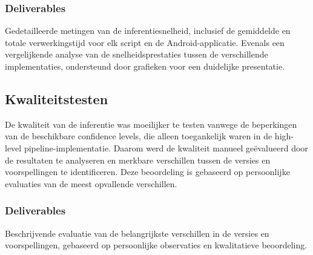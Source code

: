 \subsubsection{Deliverables}

Gedetailleerde metingen van de inferentiesnelheid, inclusief de gemiddelde en totale verwerkingstijd voor elk script en de Android-applicatie. Evenals een vergelijkende analyse van de snelheidsprestaties tussen de verschillende implementaties, ondersteund door grafieken voor een duidelijke presentatie.

\subsection{Kwaliteitstesten}

De kwaliteit van de inferentie was moeilijker te testen vanwege de beperkingen van de beschikbare confidence levels, die alleen toegankelijk waren in de high-level pipeline-implementatie. Daarom werd de kwaliteit manueel geëvalueerd door de resultaten te analyseren en merkbare verschillen tussen de versies en voorspellingen te identificeren. Deze beoordeling is gebaseerd op persoonlijke evaluaties van de meest opvallende verschillen.

\subsubsection{Deliverables}

Beschrijvende evaluatie van de belangrijkste verschillen in de versies en voorspellingen, gebaseerd op persoonlijke observaties en kwalitatieve beoordeling.

